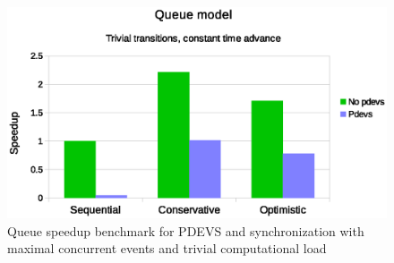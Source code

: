 \begin{figure}
	\center
	\includegraphics[width=\columnwidth]{fig/pdevs_no_sleep.eps}
	\caption{Queue speedup benchmark for PDEVS and synchronization with maximal concurrent events and trivial computational load}
	\label{fig:pdevs_plot_no_sleep}
\end{figure} 